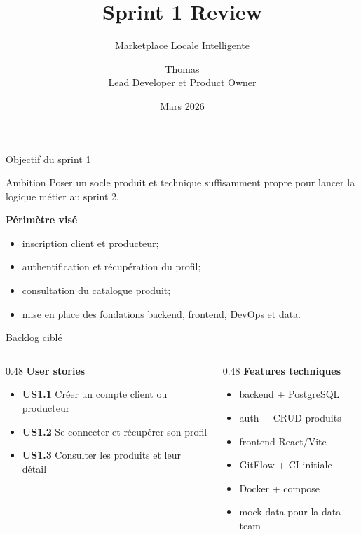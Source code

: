 \documentclass[10pt,aspectratio=169]{beamer}
\title{Sprint 1 Review}
\subtitle{Marketplace Locale Intelligente}
\author{Thomas\\Lead Developer et Product Owner}
\date{Mars 2026}
\begin{document}
\begin{frame}
  \titlepage
\end{frame}

\begin{frame}{Objectif du sprint 1}
  \begin{block}{Ambition}
    Poser un socle produit et technique suffisamment propre pour lancer la logique métier au sprint 2.
  \end{block}

  \vspace{0.4cm}

  \textbf{Périmètre visé}
  \begin{itemize}
    \item inscription client et producteur;
    \item authentification et récupération du profil;
    \item consultation du catalogue produit;
    \item mise en place des fondations backend, frontend, DevOps et data.
  \end{itemize}
\end{frame}

\begin{frame}{Backlog ciblé}
  \begin{columns}[T]
    \begin{column}{0.48\textwidth}
      \textbf{User stories}
      \begin{itemize}
        \item \textbf{US1.1} Créer un compte client ou producteur
        \item \textbf{US1.2} Se connecter et récupérer son profil
        \item \textbf{US1.3} Consulter les produits et leur détail
      \end{itemize}
    \end{column}
    \begin{column}{0.48\textwidth}
      \textbf{Features techniques}
      \begin{itemize}
        \item backend + PostgreSQL
        \item auth + CRUD produits
        \item frontend React/Vite
        \item GitFlow + CI initiale
        \item Docker + compose
        \item mock data pour la data team
      \end{itemize}
    \end{column}
  \end{columns}
\end{frame}
\end{document}
